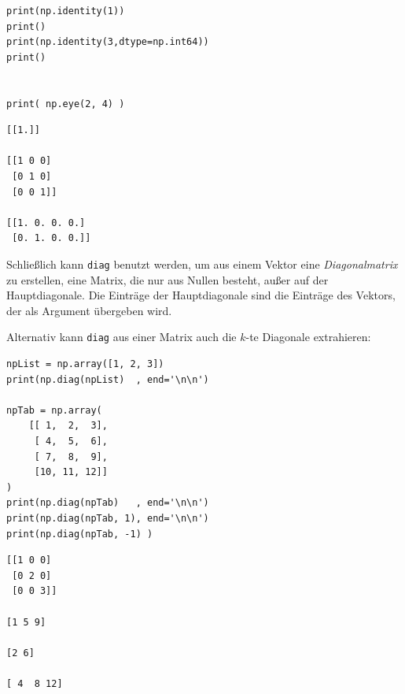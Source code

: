 \begin{tcbraster}[raster columns=2,
                  raster equal height,
                  nobeforeafter,
                  raster column skip=0.5cm]
\begin{codebox}
\begin{verbatim}
print(np.identity(1))
print()
print(np.identity(3,dtype=np.int64))
print()


print( np.eye(2, 4) )
\end{verbatim}
\end{codebox}
%
\begin{cmdbox}
\begin{verbatim}
[[1.]]

[[1 0 0]
 [0 1 0]
 [0 0 1]]

[[1. 0. 0. 0.]
 [0. 1. 0. 0.]]
\end{verbatim}
\end{cmdbox}
\end{tcbraster}

Schließlich kann \texttt{diag} benutzt werden, um aus einem Vektor eine \emph{Diagonalmatrix} zu erstellen, \ie eine Matrix, die nur aus Nullen besteht, außer auf der Hauptdiagonale. Die Einträge der Hauptdiagonale sind die Einträge des Vektors, der als Argument übergeben wird.

Alternativ kann \texttt{diag} aus einer Matrix auch die $k$-te Diagonale extrahieren:

\begin{tcbraster}[raster columns=2,
                  raster equal height,
                  nobeforeafter,
                  raster column skip=0.5cm]
\begin{codebox}
\begin{verbatim}
npList = np.array([1, 2, 3])
print(np.diag(npList)  , end='\n\n')

npTab = np.array(
    [[ 1,  2,  3],
     [ 4,  5,  6],
     [ 7,  8,  9],
     [10, 11, 12]]
)
print(np.diag(npTab)   , end='\n\n')
print(np.diag(npTab, 1), end='\n\n')
print(np.diag(npTab, -1) )
\end{verbatim}
\end{codebox}
%
\begin{cmdbox}
\begin{verbatim}
[[1 0 0]
 [0 2 0]
 [0 0 3]]

[1 5 9]

[2 6]

[ 4  8 12]
\end{verbatim}
\end{cmdbox}
\end{tcbraster}

